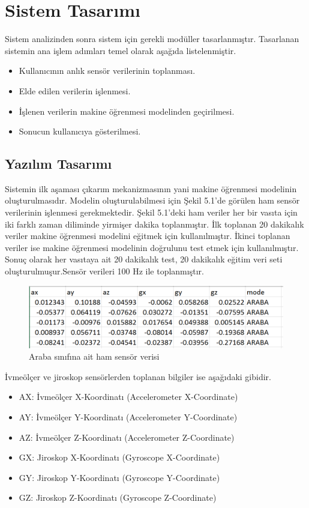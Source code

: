 \chapter{Sistem Tasarımı}
Sistem analizinden sonra sistem için gerekli modüller tasarlanmıştır. Tasarlanan sistemin ana işlem adımları temel olarak aşağıda listelenmiştir.
\begin{itemize}
  \item Kullanıcının anlık sensör verilerinin toplanması.
  \item Elde edilen verilerin işlenmesi.
  \item İşlenen verilerin makine öğrenmesi modelinden geçirilmesi.
  \item Sonucun kullanıcıya gösterilmesi.
\end{itemize}

\section{Yazılım Tasarımı}


Sistemin ilk aşaması çıkarım mekanizmasının yani makine öğrenmesi modelinin oluşturulmasıdır. Modelin oluşturulabilmesi için Şekil 5.1'de görülen ham sensör verilerinin işlenmesi gerekmektedir. Şekil 5.1'deki ham veriler her bir vasıta için iki farklı zaman diliminde yirmişer dakika toplanmıştır. İlk toplanan 20 dakikalık veriler makine öğrenmesi modelini eğitmek için kullanılmıştır. İkinci toplanan veriler ise makine öğrenmesi modelinin doğrulunu test etmek için kullanılmıştır. Sonuç olarak her vasıtaya ait 20 dakikalık test, 20 dakikalık eğitim veri seti oluşturulmuşur.Sensör verileri 100 Hz ile toplanmıştır.
\begin{figure}[!htbp]
\centering
\includegraphics[scale=0.6]{projectChapters/images/rawdata.png}
\caption{Araba sınıfına ait ham sensör verisi}
\end{figure}
\newpage

İvmeölçer ve jiroskop sensörlerden toplanan bilgiler ise aşağıdaki gibidir.
\begin{itemize}
  \item AX: İvmeölçer X-Koordinatı (Accelerometer X-Coordinate)
  \item AY: İvmeölçer Y-Koordinatı (Accelerometer Y-Coordinate)
  \item AZ: İvmeölçer Z-Koordinatı (Accelerometer Z-Coordinate)
  \\
  \item GX: Jiroskop X-Koordinatı (Gyroscope X-Coordinate)
  \item GY: Jiroskop Y-Koordinatı (Gyroscope Y-Coordinate)
  \item GZ: Jiroskop Z-Koordinatı (Gyroscope Z-Coordinate)
\end{itemize}

